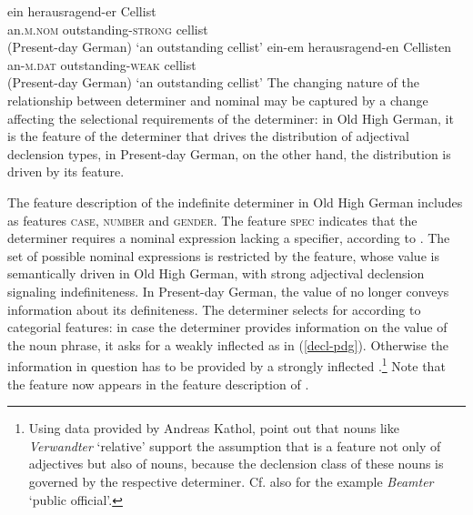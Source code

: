 \documentclass[output=paper
	        ,collection
	        ,collectionchapter
 	        ,biblatex
                ,babelshorthands
                ,newtxmath
                ,draftmode
                ,colorlinks, citecolor=brown
]{./langsci/langscibook}
\begin{document}
\eal
\ex 
\gll ein herausragend-er Cellist  \\ an.\textsc{m.nom} outstanding-\textsc{strong} cellist\\  \hfill (Present-day German)
\glt `an outstanding cellist'
\ex
\gll ein-em herausragend-en Cellisten \\ an-\textsc{m.dat} outstanding-\textsc{weak} {cellist}\\ \hfill (Present-day German)
\glt `an outstanding cellist'
\zl
The changing nature of the relationship between determiner and nominal may be captured by a change affecting the selectional requirements of the determiner: in Old High German, it is the \content feature of the determiner that drives the distribution of adjectival declension types, in Present-day German, on the other hand, the distribution is driven by its \cat feature. 

The feature description of the indefinite determiner in Old High German includes as \AGR {} features \textsc{case}, \textsc{number} and \textsc{gender}. The feature \textsc{spec} indicates that the determiner requires a nominal expression lacking a specifier, \ie \nom {} according to \cite[64]{SaWaBe2003}. The set of possible nominal expressions is restricted by the \decl feature, whose value is semantically driven in Old High German, with strong adjectival declension signaling indefiniteness.  
\ea 
{}
\z  
In Present-day German, the \decl value of \nom {} no longer conveys information about its definiteness. The determiner selects for \nom according to categorial features: in case the determiner provides information on the \AGR {} value of the noun phrase, it asks for a weakly inflected \nom {} as in (\ref{decl-pdg}). Otherwise the information in question has to be provided by a strongly inflected \nom.\footnote{Using data provided by Andreas Kathol, \cite[373]{PoSa94} point out that nouns like \textit{Verwandter} `relative' support the assumption that \decl {} is a feature not only of adjectives but also of nouns, because the declension class of these nouns is governed by the respective determiner. Cf. also \cite[64]{kiss1995} for the example \textit{Beamter} `public official'.} Note that the \decl feature now appears in the feature description of \cat \citep[65]{kiss1995}.
\ea \label{decl-pdg}
\z 
\end{document}
